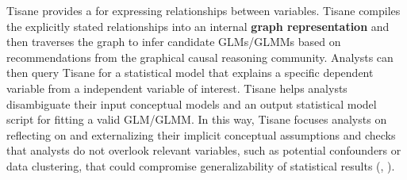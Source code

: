 Tisane provides a \textbf{\SDSLlong} for expressing %
relationships between variables. Tisane compiles the explicitly stated
relationships into an internal \textbf{graph representation} and then traverses
the graph to infer candidate GLMs/GLMMs based on recommendations from the
graphical causal reasoning community. Analysts can then query Tisane for a
statistical model that explains a specific dependent variable from a independent
variable of interest. Tisane helps analysts disambiguate their input conceptual
models and an output statistical model script for fitting a valid GLM/GLMM. In
this way, Tisane focuses analysts on reflecting on and externalizing their
implicit conceptual assumptions and checks that analysts do not overlook
relevant variables, such as potential confounders or data clustering, that could
compromise generalizability of statistical results (\higherLevel,
\connectConceptualStats). 






